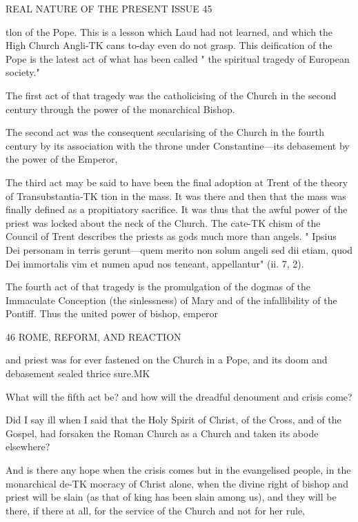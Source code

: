 \documentclass[12pt,a5paper,oneside]{book}
\begin{document}
REAL NATURE OF THE PRESENT ISSUE 45 

tlon of the Pope. This is a lesson which Laud 
had not learned, and which the High Church Angli-TK
cans to-day even do not grasp. This deification of 
the Pope is the latest act of what has been called 
" the spiritual tragedy of European society." 

The first act of that tragedy was the catholicising 
of the Church in the second century through the 
power of the monarchical Bishop. 

The second act was the consequent secularising of 
the Church in the fourth century by its association 
with the throne under Constantine---its debasement 
by the power of the Emperor, 

The third act may be said to have been the final 
adoption at Trent of the theory of Transubstantia-TK
tion in the mass. It was there and then that the 
mass was finally defined as a propitiatory sacrifice. 
It was thus that the awful power of the priest was 
locked about the neck of the Church. The cate-TK
chism of the Council of Trent describes the priests as 
gods much more than angels. " Ipsius Dei personam 
in terris gerunt---quem merito non solum angeli sed 
dii etiam, quod Dei immortalis vim et numen apud 
nos teneant, appellantur" (ii. 7, 2). 

The fourth act of that tragedy is the promulgation 
of the dogmas of the Immaculate Conception (the 
sinlessness) of Mary and of the infallibility of the 
Pontiff. Thus the united power of bishop, emperor 



46 ROME, REFORM, AND REACTION 

and priest was for ever fastened on the Church in a 
Pope, and its doom and debasement sealed thrice sure.MK 

What will the fifth act be? and how will the 
dreadful denoument and crisis come? 

Did I say ill when I said that the Holy Spirit of 
Christ, of the Cross, and of the Gospel, had forsaken 
the Roman Church as a Church and taken its abode 
elsewhere? 

And is there any hope when the crisis comes but 
in the evangelised people, in the monarchical de-TK
mocracy of Christ alone, when the divine right of 
bishop and priest will be slain (as that of king has 
been slain among us), and they will be there, if there at 
all, for the service of the Church and not for her rule, 
\end{document}
